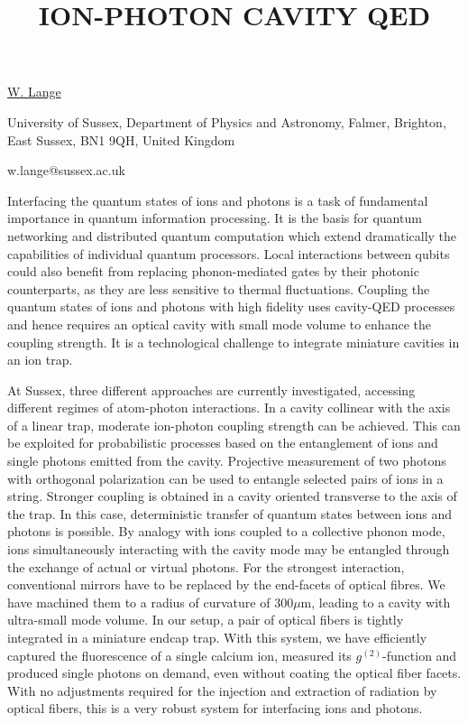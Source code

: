 \title{ION-PHOTON CAVITY QED}

\underline{W. Lange} 

{\normalsize{\vspace{-4mm}
University of Sussex, Department of Physics and Astronomy, Falmer, Brighton, East Sussex, BN1 9QH, United Kingdom

\email w.lange@sussex.ac.uk}}

Interfacing the quantum states of ions and photons is a task of fundamental importance in quantum information processing. It is the basis for quantum networking and distributed quantum computation which extend dramatically the capabilities of individual quantum processors. Local interactions between qubits could also benefit from replacing phonon-mediated gates by their photonic counterparts, as they are less sensitive to thermal fluctuations. Coupling the quantum states of ions and photons with high fidelity uses cavity-QED processes and hence requires an optical cavity with small mode volume to enhance the coupling strength. It is a technological challenge to integrate miniature cavities in an ion trap.

At Sussex, three different approaches are currently investigated, accessing different regimes of atom-photon interactions. In a cavity collinear with the axis of a linear trap, moderate ion-photon coupling strength can be achieved. This can be exploited for probabilistic processes based on the entanglement of ions and single photons emitted from the cavity. Projective measurement of two photons with orthogonal polarization can be used to entangle selected pairs of ions in a string. Stronger coupling is obtained in a cavity oriented transverse to the axis of the trap. In this case, deterministic transfer of quantum states between ions and photons is possible. By analogy with ions coupled to a collective phonon mode, ions simultaneously interacting with the cavity mode may be entangled through the exchange of actual or virtual photons. For the strongest interaction, conventional mirrors have to be replaced by the end-facets of optical fibres. We have machined them to a radius of curvature of 300$\mu$m, leading to a cavity with ultra-small mode volume. In our setup, a pair of optical fibers is tightly integrated in a miniature endcap trap. With this system, we have efficiently captured the fluorescence of a single calcium ion, measured its $g^{(2)}$-function and produced single photons on demand, even without coating the optical fiber facets. With no adjustments required for the injection and extraction of radiation by optical fibers, this is a very robust system for interfacing ions and photons.

\vspace{\baselineskip} 